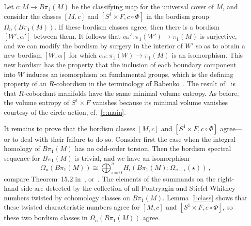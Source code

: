 \documentclass[12pt]{amsart}
\theoremstyle{definition}
\theoremstyle{remark}
\begin{document}
    Let $c\colon M\rightarrow B\pi_{1}(M)$ be the classifying map for the universal 
    cover of $M$, and consider the classes $[M,c]$ and $[S^{1}\times F,c\circ\Phi ]$ 
    in the bordism group $\Omega_{n}(B\pi_{1}(M))$. If these bordism classes 
    agree, then there is a bordism $[W',\alpha']$ between them. It follows that 
    $\alpha_{*}'\colon\pi_{1}(W')\rightarrow\pi_{1}(M)$ is surjective, and we can 
    modify the bordism by surgery in the interior of $W'$ so as to obtain a new 
    bordism $[W,\alpha]$ for which $\alpha_{*}\colon\pi_{1}(W)\rightarrow\pi_{1}(M)$ 
    is an isomorphism. This new bordism has the property that the inclusion of each 
    boundary component into $W$ induces an isomorphism on fundamental groups,
    which is the defining property of an $R$-cobordism in the terminology of Babenko~\cite{B2}.
    The result of~\cite{B2} is that $R$-cobordant manifolds have the same minimal 
    volume entropy. As before, the volume entropy of $S^{1}\times F$ vanishes 
    because its minimal volume vanishes courtesy of the circle action, cf.~\eqref{e:main}.
    
    It remains to prove that the bordism classes $[M,c]$ and $[S^{1}\times F,c\circ\Phi ]$ 
    agree---or to deal with their failure to do so. 
    Consider first the case when the integral homology of $B\pi_1(M)$ has no odd-order
    torsion. Then the bordism spectral sequence for $B\pi_1(M)$ is trivial, and we have
    an isomorphism
    \begin{equation}\label{e:bordism}
    \Omega_{n}(B\pi_{1}(M))\cong\bigoplus_{i=0}^n H_{i}(B\pi_{1}(M);\Omega_{n-i}(\star)) \ ,
    \end{equation}
    compare Theorem~15.2 in~\cite{CF}, or~\cite{Stong}.
    The elements of the summands on the right-hand side are detected by the collection of all Pontryagin 
    and Stiefel-Whitney numbers twisted by cohomology classes on $B\pi_{1}(M)$.
    Lemma~\ref{l:class} shows that these twisted characteristic numbers agree
    for $[M,c]$ and $[S^{1}\times F,c\circ\Phi ]$, so these two bordism classes in 
    $\Omega_{n}(B\pi_{1}(M))$ agree.
    
\end{document}
